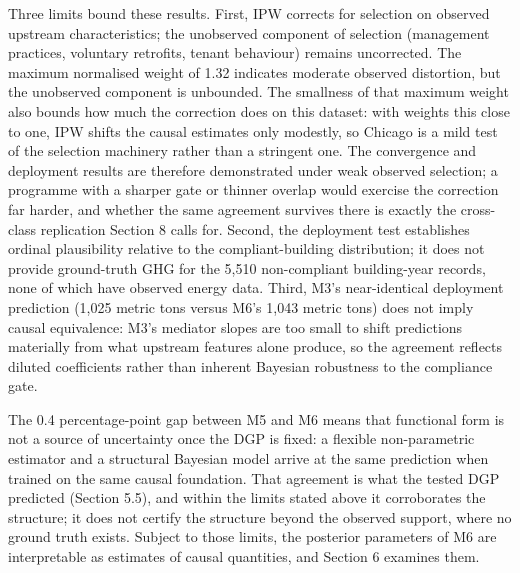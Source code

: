 Three limits bound these results. First, IPW corrects for selection on observed upstream characteristics; the unobserved component of selection (management practices, voluntary retrofits, tenant behaviour) remains uncorrected. The maximum normalised weight of 1.32 indicates moderate observed distortion, but the unobserved component is unbounded. The smallness of that maximum weight also bounds how much the correction does on this dataset: with weights this close to one, IPW shifts the causal estimates only modestly, so Chicago is a mild test of the selection machinery rather than a stringent one. The convergence and deployment results are therefore demonstrated under weak observed selection; a programme with a sharper gate or thinner overlap would exercise the correction far harder, and whether the same agreement survives there is exactly the cross-class replication Section 8 calls for. Second, the deployment test establishes ordinal plausibility relative to the compliant-building distribution; it does not provide ground-truth GHG for the 5,510 non-compliant building-year records, none of which have observed energy data. Third, M3's near-identical deployment prediction (1,025 metric tons versus M6's 1,043 metric tons) does not imply causal equivalence: M3's mediator slopes are too small to shift predictions materially from what upstream features alone produce, so the agreement reflects diluted coefficients rather than inherent Bayesian robustness to the compliance gate.

The 0.4 percentage-point gap between M5 and M6 means that functional form is not a source of uncertainty once the DGP is fixed: a flexible non-parametric estimator and a structural Bayesian model arrive at the same prediction when trained on the same causal foundation. That agreement is what the tested DGP predicted (Section 5.5), and within the limits stated above it corroborates the structure; it does not certify the structure beyond the observed support, where no ground truth exists. Subject to those limits, the posterior parameters of M6 are interpretable as estimates of causal quantities, and Section 6 examines them.

